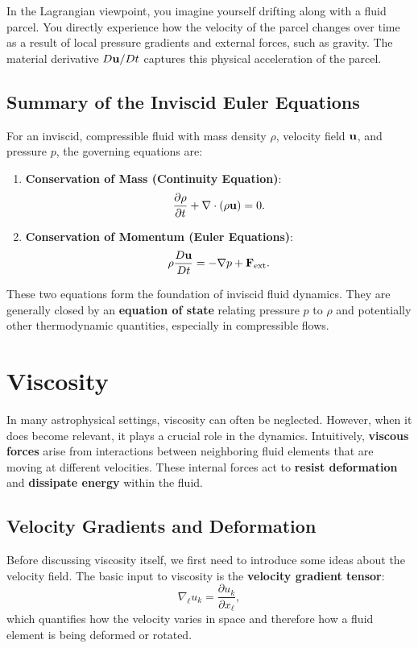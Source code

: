 \begin{remark}
    In the Lagrangian viewpoint, you imagine yourself drifting along with a fluid parcel. You directly experience how the velocity of the parcel changes over time as a result of local pressure gradients and external forces, such as gravity. The material derivative $D{\bf u}/Dt$ captures this physical acceleration of the parcel.
\end{remark}

\subsection*{Summary of the Inviscid Euler Equations}

For an inviscid, compressible fluid with mass density $\rho$, velocity field ${\bf u}$, and pressure $p$, the governing equations are:

\begin{enumerate}
    \item \textbf{Conservation of Mass (Continuity Equation)}:
    \[
    \frac{\partial \rho}{\partial t} + \nabla \cdot ( \rho {\bf u} ) = 0.
    \]

    \item \textbf{Conservation of Momentum (Euler Equations)}:
    \[
    \rho \frac{D {\bf u}}{D t} = - \nabla p + {\bf F}_{\rm ext}.
    \]
\end{enumerate}

These two equations form the foundation of inviscid fluid dynamics. They are generally closed by an \textbf{equation of state} relating pressure $p$ to $\rho$ and potentially other thermodynamic quantities, especially in compressible flows.

\section{Viscosity}
In many astrophysical settings, viscosity can often be neglected. However, when it does become relevant, it plays a crucial role in the dynamics. Intuitively, \textbf{viscous forces} arise from interactions between neighboring fluid elements that are moving at different velocities. These internal forces act to \textbf{resist deformation} and \textbf{dissipate energy} within the fluid.

\vspace{0.25cm}

\subsection{Velocity Gradients and Deformation}
Before discussing viscosity itself, we first need to introduce some ideas about the velocity field. The basic input to viscosity is the \textbf{velocity gradient tensor}:
\[
\nabla_\ell u_k = \frac{\partial u_k}{\partial x_\ell},
\]
which quantifies how the velocity varies in space and therefore how a fluid element is being deformed or rotated. 

